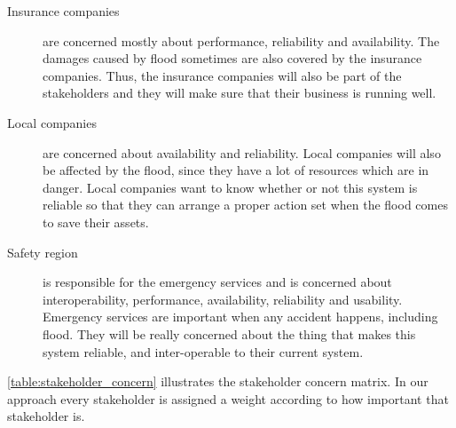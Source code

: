 \begin{description}
	\item[Insurance companies] are concerned mostly about performance, reliability and availability. The damages caused by flood sometimes are also covered by the insurance companies. Thus, the insurance companies will also be part of the stakeholders and they will make sure that their business is running well.
			
	\item[Local companies] are concerned about availability and reliability. Local companies will also be affected by the flood, since they have a lot of resources which are in danger. Local companies want to know whether or not this system is reliable so that they can arrange a proper action set when the flood comes to save their assets.
			
	\item[Safety region] is responsible for the emergency services and is concerned about interoperability, performance, availability, reliability and usability. Emergency services are important when any accident happens, including flood. They will be really concerned about the thing that makes this system reliable, and inter-operable to their current system.
\end{description}

\autoref{table:stakeholder_concern} illustrates the stakeholder concern matrix. In our approach every stakeholder is assigned a weight according to how important that stakeholder is. 

